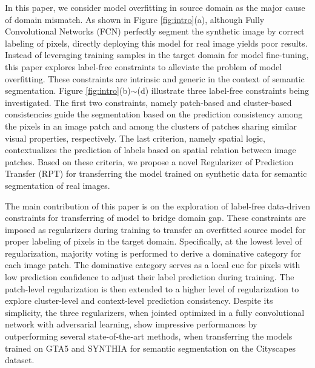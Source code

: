 \documentclass[10pt,twocolumn,letterpaper]{article}
\begin{document}
In this paper, we consider model overfitting in source domain as the major cause of domain mismatch. As shown in Figure \ref{fig:intro}(a), although Fully Convolutional Networks (FCN) perfectly segment the synthetic image by correct labeling of pixels, directly deploying this model for real image yields poor results. Instead of leveraging training samples in the target domain for model fine-tuning, this paper explores label-free constraints to alleviate the problem of model overfitting. These constraints are intrinsic and generic in the context of semantic segmentation. Figure \ref{fig:intro}(b)$\sim$(d) illustrate three label-free constraints being investigated. The first two constraints, namely patch-based and cluster-based consistencies guide the segmentation based on the prediction consistency among the pixels in an image patch and among the clusters of patches sharing similar visual properties, respectively. The last criterion, namely spatial logic, contextualizes the prediction of labels based on spatial relation between image patches. Based on these criteria, we propose a novel Regularizer of Prediction Transfer (RPT) for transferring the model trained on synthetic data for semantic segmentation of real images.

The main contribution of this paper is on the exploration of label-free data-driven constraints for transferring of model to bridge domain gap. These constraints are imposed as regularizers during training to transfer an overfitted source model for proper labeling of pixels in the target domain. Specifically, at the lowest level of regularization, majority voting is performed to derive a dominative category for each image patch. The dominative category serves as a local cue for pixels with low prediction confidence to adjust their label prediction during training. The patch-level regularization is then extended to a higher level of regularization to explore cluster-level and context-level prediction consistency.
Despite its simplicity, the three regularizers, when jointed optimized in a fully convolutional network with adversarial learning, show impressive performances by outperforming several state-of-the-art methods, when transferring the models trained on GTA5 and SYNTHIA for semantic segmentation on the Cityscapes dataset.

\vspace{-0.05in}
\end{document}
